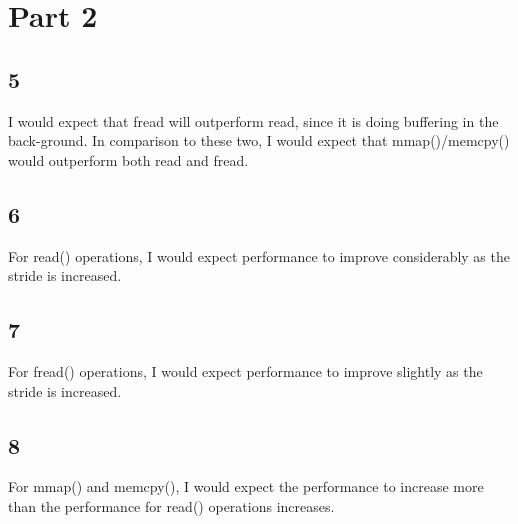 \documentclass[]{scrartcl}
\begin{document}
\section*{Part 2}
\subsection*{5}
I would expect that fread will outperform read, since it is doing buffering in the back-ground. In comparison to these two, I would expect that mmap()/memcpy() would
outperform both read and fread.
\subsection*{6}
For read() operations, I would expect performance to improve considerably as the stride
is increased.
\subsection*{7}
For fread() operations, I would expect performance to improve slightly as the stride is increased.
\subsection*{8}
For mmap() and memcpy(), I would expect the performance to increase more than the performance for read() operations increases.
\pagebreak
\end{document}
